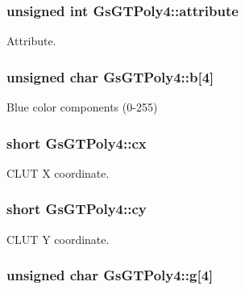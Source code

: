 \subsubsection[{attribute}]{\setlength{\rightskip}{0pt plus 5cm}unsigned int Gs\+G\+T\+Poly4\+::attribute}\label{structGsGTPoly4_afa584c5cbcc2623f56fb341ee4c4a5ba}


Attribute. 

\hypertarget{structGsGTPoly4_aa1759d4a006f560d2588117df89c7963}{}
\subsubsection[{b}]{\setlength{\rightskip}{0pt plus 5cm}unsigned char Gs\+G\+T\+Poly4\+::b\mbox{[}4\mbox{]}}\label{structGsGTPoly4_aa1759d4a006f560d2588117df89c7963}


Blue color components (0-\/255) 

\hypertarget{structGsGTPoly4_a2a7f575dadefd9b5dcd94425ea00dc01}{}
\subsubsection[{cx}]{\setlength{\rightskip}{0pt plus 5cm}short Gs\+G\+T\+Poly4\+::cx}\label{structGsGTPoly4_a2a7f575dadefd9b5dcd94425ea00dc01}


C\+L\+U\+T X coordinate. 

\hypertarget{structGsGTPoly4_ab5b4698aa650f9ed928bda6a34568e4e}{}
\subsubsection[{cy}]{\setlength{\rightskip}{0pt plus 5cm}short Gs\+G\+T\+Poly4\+::cy}\label{structGsGTPoly4_ab5b4698aa650f9ed928bda6a34568e4e}


C\+L\+U\+T Y coordinate. 

\hypertarget{structGsGTPoly4_af9a458ed7980f31f46f7dd4108ed896e}{}
\subsubsection[{g}]{\setlength{\rightskip}{0pt plus 5cm}unsigned char Gs\+G\+T\+Poly4\+::g\mbox{[}4\mbox{]}}\label{structGsGTPoly4_af9a458ed7980f31f46f7dd4108ed896e}


